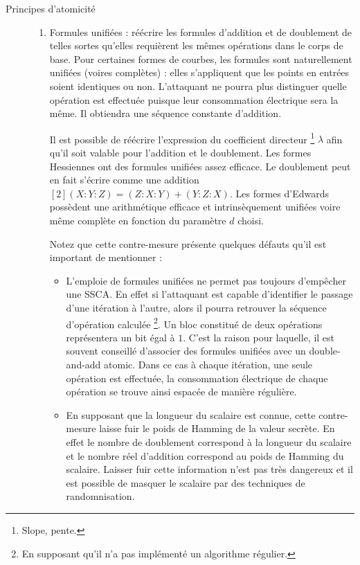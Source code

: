 \begin{description}
    \item[Principes d'atomicité] \hfill
    \begin{enumerate}
        \item Formules unifiées : réécrire les formules d'addition et de doublement de telles sortes qu'elles requièrent les mêmes opérations dans le corps de base. Pour certaines formes de courbes, les formules sont naturellement unifiées (voires complètes) : elles s'appliquent que les points en entrées soient identiques ou non. L'attaquant ne pourra plus distinguer quelle opération est effectuée puisque leur consommation électrique sera la même. Il obtiendra une séquence constante d'addition. 
        
        Il est possible de réécrire l'expression du coefficient directeur \footnote{Slope, pente.} $\lambda$ afin qu'il soit valable pour l'addition et le doublement. Les formes Hessiennes ont des formules unifiées assez efficace. Le doublement peut en fait s'écrire comme une addition $[2](X : Y : Z) = (Z : X : Y) + (Y : Z : X)$. Les formes d'Edwards possèdent une arithmétique efficace et intrinsèquement unifiées voire même complète en fonction du paramètre $d$ choisi. 
        
        Notez que cette contre-mesure présente quelques défauts qu'il est important de mentionner :
        \begin{itemize}[label=--]
            \item L'emploie de formules unifiées ne permet pas toujours d'empêcher une SSCA. En effet si l'attaquant est capable d'identifier le passage d'une itération à l'autre, alors il pourra retrouver la séquence d'opération calculée \footnote{En supposant qu'il n'a pas implémenté un algorithme régulier.}. Un bloc constitué de deux opérations représentera un bit égal à $1$. C'est la raison pour laquelle, il est souvent conseillé d'associer des formules unifiées avec un double-and-add atomic. Dans ce cas à chaque itération, une seule opération est effectuée, la consommation électrique de chaque opération se trouve ainsi espacée de manière régulière. 
            \item En supposant que la longueur du scalaire est connue, cette contre-mesure laisse fuir le poids de Hamming de la valeur secrète. En effet le nombre de doublement correspond à la longueur du scalaire et le nombre réel d'addition correspond au poids de Hamming du scalaire. Laisser fuir cette information n'est pas très dangereux et il est possible de masquer le scalaire par des techniques de randomnisation.
        \end{itemize}
        

\end{enumerate}
\end{description}
